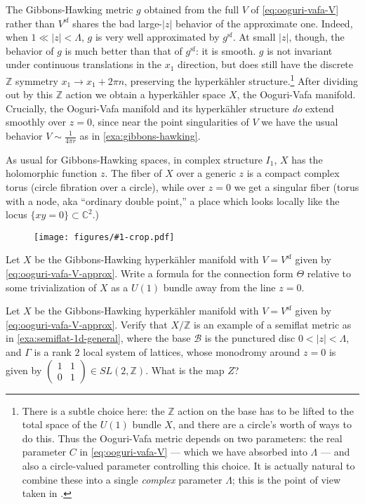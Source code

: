 \documentclass[12pt,letterpaper,reqno]{article}
\numberwithin{equation}{section}
\newcommand{\cB}{\ensuremath{\mathcal B}}
\newcommand{\C}{\ensuremath{\mathbb C}}
\newcommand{\Z}{\ensuremath{\mathbb Z}}
\newcommand{\hk}{hyperk\"ahler\xspace}
\renewcommand{\sf}{\mathrm{sf}}
\newcommand{\abs}[1]{\lvert#1\rvert}
\newcommand{\ti}[1]{\textit{#1}}
\newcommand{\insfig}[2]{\begin{figure}[htbp] \centering \texttt{[image: figures/\#1-crop.pdf]} \label{fig:#1} \end{figure}}
\begin{document}
\begin{example}
The Gibbons-Hawking metric $g$ obtained from the full $V$ 
of \eqref{eq:ooguri-vafa-V} rather than $V^\sf$ 
shares the bad large-$\abs{z}$ behavior
of the approximate one. Indeed, when $1 \ll \abs{z} < \Lambda$,
$g$ is very well approximated by $g^\sf$.
At small $\abs{z}$, though, the behavior of $g$ is much better than that
of $g^\sf$: it is smooth. 
$g$ is not invariant under continuous translations in 
the $x_1$ direction, but does still have the discrete $\Z$ 
symmetry $x_1 \to x_1 + 2 \pi n$, preserving
the \hk structure.\footnote{There is a subtle choice here:
the $\Z$ action on the base has to be lifted to the total space
of the $U(1)$ bundle $X$, and there are a circle's worth of ways
to do this. Thus the Ooguri-Vafa metric depends on two parameters:
the real parameter $C$ in \eqref{eq:ooguri-vafa-V} --- which we have 
absorbed into $\Lambda$ --- and also a circle-valued
parameter controlling this choice. It is actually natural to combine
these into a single \ti{complex} parameter $\Lambda$; this is the
point of view taken in \cite{Gaiotto:2008cd}.}
After dividing out by this $\Z$ action we obtain a \hk 
space $X$, the Ooguri-Vafa manifold. Crucially, the Ooguri-Vafa
manifold and its \hk structure \ti{do} extend smoothly over $z=0$, since near
the point singularities of $V$ we have the usual behavior
$V \sim \frac{1}{4 \pi r}$ as in \autoref{exa:gibbons-hawking}.

As usual for Gibbons-Hawking spaces, 
in complex structure $I_1$, $X$ has the holomorphic function $z$. 
The fiber of $X$ over a generic $z$ is a compact complex torus (circle
fibration over a circle), while over $z=0$ we get a singular
fiber (torus with a node, aka ``ordinary double point,'' a place
which looks locally like the locus $\{xy=0\} \subset \C^2$.)

\end{example}

\insfig{higgs-bundles-8}{0.92}

\begin{exercise} Let $X$ be the Gibbons-Hawking
\hk manifold with $V = V^\sf$ given by \eqref{eq:ooguri-vafa-V-approx}.
Write a formula for the connection form $\Theta$ relative to 
some trivialization of $X$ as a $U(1)$ bundle away from the
line $z = 0$.
\end{exercise}

\begin{exercise} \label{exc:ooguri-vafa-semiflat} Let $X$ be the Gibbons-Hawking
\hk manifold with $V = V^\sf$ given by \eqref{eq:ooguri-vafa-V-approx}.
Verify that $X / \Z$ is an example of a semiflat metric as in 
\autoref{exa:semiflat-1d-general}, where the base $\cB$ is the 
punctured disc $0 < \abs{z} < \Lambda$, and $\Gamma$ is a rank $2$
local system of lattices, whose monodromy around $z=0$
is given by
$\begin{pmatrix} 1 & 1 \\ 0 & 1 \end{pmatrix} \in SL(2,\Z)$.
What is the map $Z$?
\end{exercise}
\end{document}
